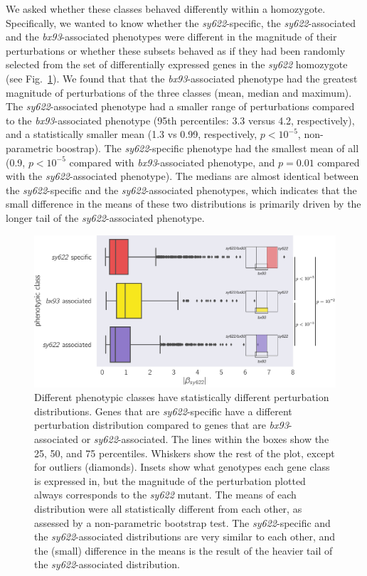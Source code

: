 \documentclass[10pt, onecolumn]{article}
\begin{document}
We asked whether these classes behaved differently within a homozygote.
Specifically, we wanted to know whether the \emph{sy622}-specific, the
\emph{sy622}-associated and the \emph{bx93}-associated phenotypes were different
in the magnitude of their perturbations or whether these subsets behaved as if
they had been randomly selected from the set of differentially expressed genes
in the \emph{sy622} homozygote (see Fig.~\ref{fig:classes}). We found that that
the \emph{bx93}-associated phenotype had the greatest magnitude of perturbations
of the three classes (mean, median and maximum). The \emph{sy622}-associated
phenotype had a smaller range of perturbations compared to the
\emph{bx93}-associated phenotype (95th percentiles: 3.3 versus 4.2,
respectively), and a statistically smaller mean (1.3 vs 0.99, respectively, $p <
10^{-5}$, non-parametric boostrap). The \emph{sy622}-specific phenotype had the
smallest mean of all (0.9, $p < 10^{-5}$ compared with \emph{bx93}-associated
phenotype, and $p = 0.01$ compared with the \emph{sy622}-associated phenotype).
The medians are almost identical between the \emph{sy622}-specific and the
\emph{sy622}-associated phenotypes, which indicates that the small difference in the
means of these two distributions is primarily driven by the longer tail of the
\emph{sy622}-associated phenotype.

\begin{figure}
  \centering{}
  \includegraphics[width=\textwidth]{../figs/dpy22_classes.pdf}
  \caption{
  Different phenotypic classes have statistically different perturbation
  distributions. Genes that are \emph{sy622}-specific have a different
  perturbation distribution compared to genes that are \emph{bx93}-associated or
  \emph{sy622}-associated. The lines within the boxes show the 25, 50, and 75
  percentiles. Whiskers show the rest of the plot, except for outliers (diamonds).
  Insets show what genotypes each gene class is
  expressed in, but the magnitude of the perturbation plotted always corresponds
  to the \emph{sy622} mutant. The means of each distribution were all statistically
  different from each other, as assessed by a non-parametric bootstrap test.
  The \emph{sy622}-specific and the \emph{sy622}-associated distributions are
  very similar to each other, and the (small) difference in the means is the
  result of the heavier tail of the \emph{sy622}-associated distribution.
  }
\label{fig:classes}
\end{figure}
\end{document}
